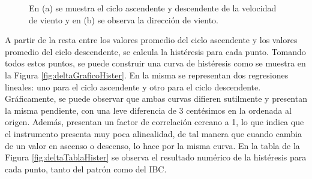 \begin{figure}[H]
    \centering
    \begin{minipage}[b]{1\textwidth}
        \centering
    \end{minipage}  
    \hspace{2em} %
    \begin{minipage}[b]{1\textwidth}
        \centering
    \end{minipage}  
    \caption{En (a) se muestra el ciclo ascendente y descendente de la velocidad de viento y en (b) se observa la dirección de viento.}
    \label{fig:deltaDatosCrudos}
\end{figure}

A partir de la resta entre los valores promedio del ciclo ascendente y los valores promedio del ciclo descendente, se calcula la histéresis para cada punto. Tomando todos estos puntos, se puede construir una curva de histéresis como se muestra en la Figura \ref{fig:deltaGraficoHister}. En la misma se representan dos regresiones lineales: uno para el ciclo ascendente y otro para el ciclo descendente. Gráficamente, se puede observar que ambas curvas difieren sutilmente y presentan la misma pendiente, con una leve diferencia de 3 centésimos en la ordenada al origen. Además, presentan un factor de correlación cercano a 1, lo que indica que el instrumento presenta muy poca alinealidad, de tal manera que cuando cambia de un valor en ascenso o descenso, lo hace por la misma curva. En la tabla de la Figura \ref{fig:deltaTablaHister} se observa el resultado numérico de la histéresis para cada punto, tanto del patrón como del IBC.

